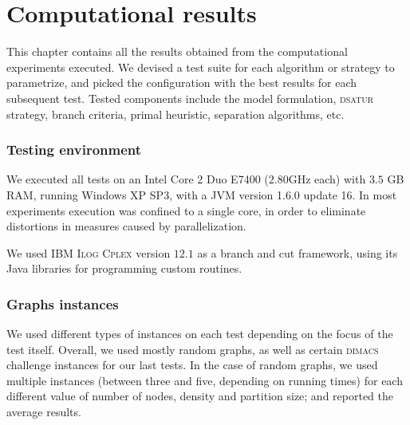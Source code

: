 
\chapter{Computational results}
\label{sec:results}

This chapter contains all the results obtained from the computational experiments executed. We devised a test suite for each algorithm or strategy to parametrize, and picked the configuration with the best results for each subsequent test. Tested components include the model formulation, \textsc{dsatur} strategy, branch criteria, primal heuristic, separation algorithms, etc.

\subsection{Testing environment}

We executed all tests on an Intel Core 2 Duo E7400 ($2.80$GHz each) with $3.5$ GB RAM, running Windows XP SP3, with a JVM version 1.6.0 update 16. In most experiments execution was confined to a single core, in order to eliminate distortions in measures caused by parallelization.

We used \textsc{IBM Ilog Cplex} version $12.1$ as a branch and cut framework, using its Java libraries for programming custom routines.

\subsection{Graphs instances}
\label{subsec:results:instances}

We used different types of instances on each test depending on the focus of the test itself. Overall, we used mostly random graphs, as well as certain \textsc{dimacs} challenge instances\cite{dimacs} for our last tests. In the case of random graphs, we used multiple instances (between three and five, depending on running times) for each different value of number of nodes, density and partition size; and reported the average results.

